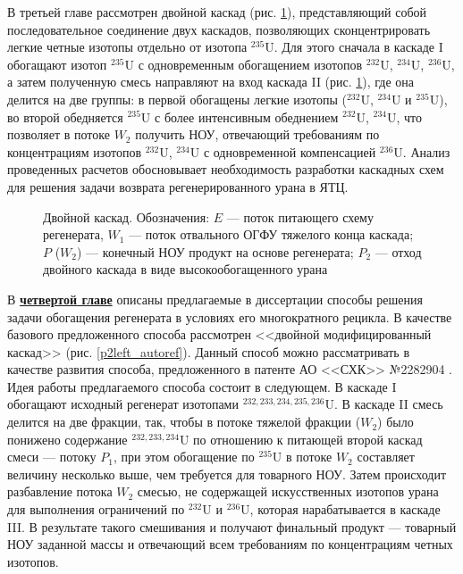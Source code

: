 В третьей главе рассмотрен двойной каскад (рис. \ref{fig:double_ru_in3}), представляющий собой последовательное соединение двух каскадов, позволяющих сконцентрировать легкие четные изотопы отдельно от изотопа $^{235}$U. Для этого сначала в каскаде I обогащают изотоп $^{235}$U с одновременным обогащением изотопов $^{232}$U, $^{234}$U, $^{236}$U, а затем полученную смесь направляют на вход каскада II (рис. \ref{fig:double_ru_in3}), где она делится на две группы: в первой обогащены легкие изотопы ($^{232}$U, $^{234}$U и $^{235}$U), во второй обедняется $^{235}$U с более интенсивным обеднением $^{232}$U, $^{234}$U, что позволяет в потоке $W_2$ получить НОУ, отвечающий требованиям по концентрациям изотопов $^{232}$U, $^{234}$U с одновременной компенсацией $^{236}$U. Анализ проведенных расчетов обосновывает необходимость разработки каскадных схем для решения задачи возврата регенерированного урана в ЯТЦ.

\begin{figure}[ht]
  \caption{Двойной каскад. Обозначения: $E$ --- поток питающего схему регенерата, $W_1$ --- поток отвального ОГФУ тяжелого конца каскада; $P$ ($W_2$) --- конечный НОУ продукт на основе регенерата; $P_2$ --- отход двойного каскада в виде высокообогащенного урана}\label{fig:double_ru_in3}
\end{figure}


В \underline{\textbf{четвертой главе}} описаны предлагаемые в диссертации способы решения задачи обогащения регенерата в условиях его многократного рецикла.
В качестве базового предложенного способа рассмотрен <<двойной модифицированный каскад>> (рис. \ref{p2left_autoref}). Данный способ можно рассматривать в качестве развития способа, предложенного в патенте АО <<СХК>> №2282904 \cite{EXTvodolazskihSposobIzotopnogoVosstanovleniya}. Идея работы предлагаемого способа состоит в следующем. В каскаде I обогащают исходный регенерат изотопами $^{232,233,234,235,236}$U. В каскаде II смесь делится на две фракции, так, чтобы в потоке тяжелой фракции ($W_2$) было понижено содержание $^{232,233,234}$U по отношению к питающей второй каскад смеси --- потоку $P_1$, при этом обогащение по $^{235}$U в потоке $W_2$ составляет величину несколько выше, чем требуется для товарного НОУ. Затем происходит разбавление потока $W_2$ смесью, не содержащей искусственных изотопов урана для выполнения ограничений по $^{232}$U и $^{236}$U, которая нарабатывается в каскаде III. В результате такого смешивания и получают финальный продукт --- товарный НОУ заданной массы и отвечающий всем требованиям по концентрациям четных изотопов. 

